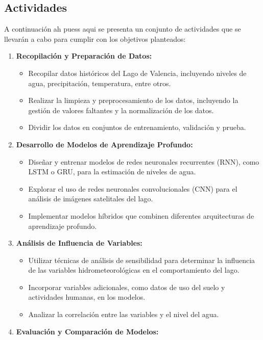 \documentclass[12pt]{article}
\begin{document}
\subsection{Actividades}
A continuaci\'on \cite{bentivoglio2022} ah puess aqui 
se presenta un conjunto de actividades que se llevarán a cabo para cumplir con los objetivos planteados:
\begin{enumerate}
    \item \textbf{Recopilación y Preparación de Datos:}
    \begin{itemize}
        \item Recopilar datos históricos del Lago de Valencia, incluyendo niveles de agua, precipitación, temperatura, entre otros.
        \item Realizar la limpieza y preprocesamiento de los datos, incluyendo la gestión de valores faltantes y la normalización de los datos.
        \item Dividir los datos en conjuntos de entrenamiento, validación y prueba.
    \end{itemize}
    \item \textbf{Desarrollo de Modelos de Aprendizaje Profundo:}
    \begin{itemize}
        \item Diseñar y entrenar modelos de redes neuronales recurrentes (RNN), como LSTM o GRU, para la estimación de niveles de agua.
        \item Explorar el uso de redes neuronales convolucionales (CNN) para el análisis de imágenes satelitales del lago.
        \item Implementar modelos híbridos que combinen diferentes arquitecturas de aprendizaje profundo.
    \end{itemize}
    \item \textbf{Análisis de Influencia de Variables:}
    \begin{itemize}
        \item Utilizar técnicas de análisis de sensibilidad para determinar la influencia de las variables hidrometeorológicas en el comportamiento del lago.
        \item Incorporar variables adicionales, como datos de uso del suelo y actividades humanas, en los modelos.
        \item Analizar la correlación entre las variables y el nivel del agua.
    \end{itemize}
    \item \textbf{Evaluación y Comparación de Modelos:}
    \begin{itemize}

\end{itemize}
\end{enumerate}
\end{document}

